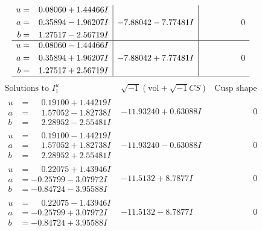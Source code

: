 \documentclass[1p]{elsarticle_modified}
\theoremstyle{definition}
\newcommand{\I}{\sqrt{-1}}
\begin{document}
$$\begin{array}{c|c|c}
\begin{aligned}
u &= \phantom{-}0.08060 + 1.44466 I \\
a &= \phantom{-}0.35894 - 1.96207 I \\
b &= \phantom{-}1.27517 - 2.56719 I\end{aligned}
 & -7.88042 - 7.77481 I & \phantom{-0.000000 } 0 \\ \hline\begin{aligned}
u &= \phantom{-}0.08060 - 1.44466 I \\
a &= \phantom{-}0.35894 + 1.96207 I \\
b &= \phantom{-}1.27517 + 2.56719 I\end{aligned}
 & -7.88042 + 7.77481 I & \phantom{-0.000000 } 0\\
 \hline 
 \end{array}$$\newpage$$\begin{array}{c|c|c}  
\text{Solutions to }I^u_{1}& \I (\text{vol} + \sqrt{-1}CS) & \text{Cusp shape}\\
 \hline 
\begin{aligned}
u &= \phantom{-}0.19100 + 1.44219 I \\
a &= \phantom{-}1.57052 - 1.82738 I \\
b &= \phantom{-}2.28952 - 2.55481 I\end{aligned}
 & -11.93240 + 0.63088 I & \phantom{-0.000000 } 0 \\ \hline\begin{aligned}
u &= \phantom{-}0.19100 - 1.44219 I \\
a &= \phantom{-}1.57052 + 1.82738 I \\
b &= \phantom{-}2.28952 + 2.55481 I\end{aligned}
 & -11.93240 - 0.63088 I & \phantom{-0.000000 } 0 \\ \hline\begin{aligned}
u &= \phantom{-}0.22075 + 1.43946 I \\
a &= -0.25799 - 3.07972 I \\
b &= -0.84724 - 3.95588 I\end{aligned}
 & -11.5132 + 8.7877 I & \phantom{-0.000000 } 0 \\ \hline\begin{aligned}
u &= \phantom{-}0.22075 - 1.43946 I \\
a &= -0.25799 + 3.07972 I \\
b &= -0.84724 + 3.95588 I\end{aligned}
 & -11.5132 - 8.7877 I & \phantom{-0.000000 } 0 \\ \hline\begin{aligned}

\end{aligned}
\end{array}$$
\end{document}
